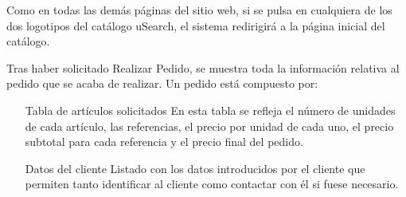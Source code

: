 Como en todas las demás páginas del sitio web, si se pulsa en cualquiera de los dos logotipos
del catálogo uSearch, el sistema redirigirá a la página inicial del catálogo.

Tras haber solicitado Realizar Pedido, se muestra toda la información relativa al pedido
que se acaba de realizar. Un pedido está compuesto por:

\begin{itemize}
	\item[Tabla de artículos solicitados] En esta tabla se refleja el número de unidades de 
	cada artículo, las referencias, el precio por unidad de cada uno, el precio subtotal para
	cada referencia y el precio final del pedido.
	
	\item[Datos del cliente] Listado con los datos introducidos por el cliente que permiten 
	tanto identificar al cliente como contactar con él si fuese necesario.
\end{itemize}